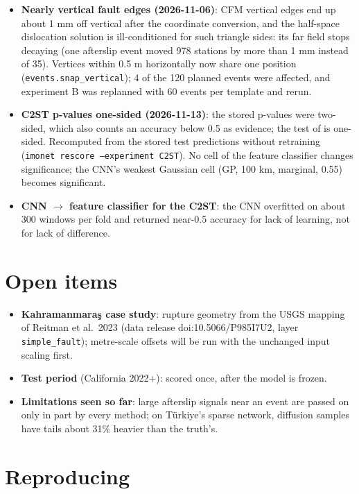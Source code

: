 \documentclass[11pt,a4paper]{article}
\begin{document}
\begin{itemize}
\item \textbf{Nearly vertical fault edges (2026-11-06)}: CFM vertical edges end up about 1 mm off vertical after the coordinate conversion, and the half-space dislocation solution is ill-conditioned for such triangle sides: its far field stops decaying (one afterslip event moved 978 stations by more than 1 mm instead of 35). Vertices within 0.5 m horizontally now share one position (\texttt{events.snap\_vertical}); 4 of the 120 planned events were affected, and experiment B was replanned with 60 events per template and rerun.
\item \textbf{C2ST p-values one-sided (2026-11-13)}: the stored p-values were two-sided, which also counts an accuracy below 0.5 as evidence; the test of \cite{lopezpaz} is one-sided. Recomputed from the stored test predictions without retraining (\texttt{imonet rescore --experiment C2ST}). No cell of the feature classifier changes significance; the CNN's weakest Gaussian cell (GP, 100 km, marginal, 0.55) becomes significant.
\item \textbf{CNN $\to$ feature classifier for the C2ST}: the CNN overfitted on about 300 windows per fold and returned near-0.5 accuracy for lack of learning, not for lack of difference.
\end{itemize}

\section{Open items}

\begin{itemize}
\item \textbf{Kahramanmaraş case study}: rupture geometry from the USGS mapping of Reitman et al.\ 2023 (data release doi:10.5066/P985I7U2, layer \texttt{simple\_fault}); metre-scale offsets will be run with the unchanged input scaling first.
\item \textbf{Test period} (California 2022+): scored once, after the model is frozen.
\item \textbf{Limitations seen so far}: large afterslip signals near an event are passed on only in part by every method; on Türkiye's sparse network, diffusion samples have tails about 31\% heavier than the truth's.
\end{itemize}

\section{Reproducing}
\end{document}
